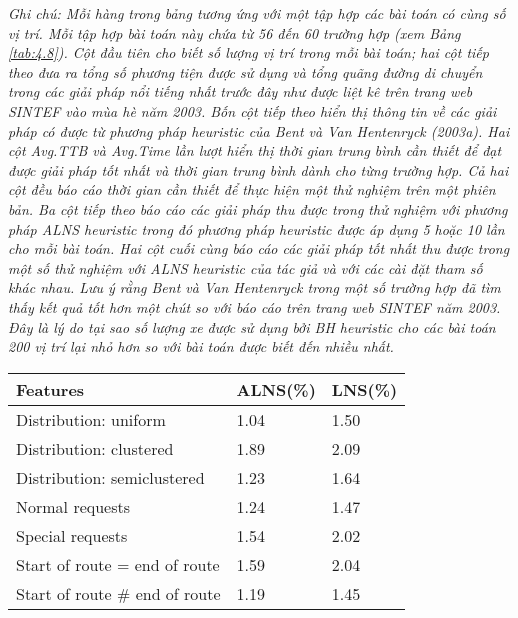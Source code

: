 \begin{table}[caption={So sánh ALNS Heuristic và những Heuristics đã có}, label=tab:4.6]
        \justify
        \textit{Ghi chú: Mỗi hàng trong bảng tương ứng với một tập hợp các bài toán có cùng số vị trí. Mỗi tập hợp bài toán này chứa từ 56 đến 60 trường hợp (xem Bảng \ref{tab:4.8}). Cột đầu tiên cho biết số lượng vị trí trong mỗi bài toán; hai cột tiếp theo đưa ra tổng số phương tiện được sử dụng và tổng quãng đường di chuyển trong các giải pháp nổi tiếng nhất trước đây như được liệt kê trên trang web SINTEF vào mùa hè năm 2003. Bốn cột tiếp theo hiển thị thông tin về các giải pháp có được từ phương pháp heuristic của Bent và Van Hentenryck (2003a). Hai cột Avg.TTB và Avg.Time lần lượt hiển thị thời gian trung bình cần thiết để đạt được giải pháp tốt nhất và thời gian trung bình dành cho từng trường hợp. Cả hai cột đều báo cáo thời gian cần thiết để thực hiện một thử nghiệm trên một phiên bản. Ba cột tiếp theo báo cáo các giải pháp thu được trong thử nghiệm với phương pháp ALNS heuristic trong đó phương pháp heuristic được áp dụng 5 hoặc 10 lần cho mỗi bài toán. Hai cột cuối cùng báo cáo các giải pháp tốt nhất thu được trong một số thử nghiệm với ALNS heuristic của tác giả và với các cài đặt tham số khác nhau. Lưu ý rằng Bent và Van Hentenryck trong một số trường hợp đã tìm thấy kết quả tốt hơn một chút so với báo cáo trên trang web SINTEF năm 2003. Đây là lý do tại sao số lượng xe được sử dụng bởi BH heuristic cho các bài toán 200 vị trí lại nhỏ hơn so với bài toán được biết đến nhiều nhất.}
\end{table}



\begin{table}[caption={Tóm tắt ảnh hưởng từ một số đặc tính nhất định của bài toán với phương pháp Heuristic}, label=tab:4.7]
    \begin{tabular}{lll}
        \toprule
        Features& ALNS(\%) & LNS(\%) \\ \midrule
    Distribution: uniform         & 1.04 & 1.50 \\
    Distribution: clustered       & 1.89 & 2.09       \\
    Distribution: semiclustered   & 1.23 & 1.64       \\
    Normal requests               & 1.24 & 1.47       \\
    Special requests              & 1.54 & 2.02       \\
    Start of route = end of route & 1.59 & 2.04       \\
    Start of route \# end of route & 1.19 & 1.45      
    \end{tabular} \\
\end{table}

